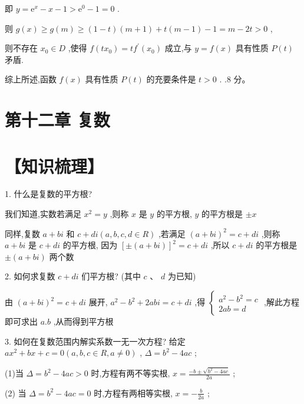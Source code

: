 \documentclass[10pt]{article}
\begin{document}
即 \(y = {\mathrm{e}}^{x} - x - 1 > {\mathrm{e}}^{0} - 1 = 0\) .

则 \(g\left( x\right)  \geq  g\left( m\right)  \geq  \left( {1 - t}\right) \left( {m + 1}\right)  + t\left( {m - 1}\right)  - 1 = m - {2t} > 0\) ,

则不存在 \({x}_{0} \in  D\) ,使得 \(f\left( {t{x}_{0}}\right)  = t{f}^{\prime }\left( {x}_{0}\right)\) 成立,与 \(y = f\left( x\right)\) 具有性质 \(P\left( t\right)\) 矛盾.

综上所述,函数 \(f\left( x\right)\) 具有性质 \(P\left( t\right)\) 的充要条件是 \(t > 0\) . .8 分。

\section*{第十二章 复数}

\section*{【知识梳理】}

1. 什么是复数的平方根?

我们知道,实数若满足 \({x}^{2} = y\) ,则称 \(x\) 是 \(y\) 的平方根, \(y\) 的平方根是 \(\pm  x\)

同样,复数 \(a + {bi}\) 和 \(c + {di}\left( {a,b,c,d \in  R}\right)\) ,若满足 \({\left( a + bi\right) }^{2} = c + {di}\) ,则称 \(a + {bi}\) 是 \(c + {di}\) 的平方根, 因为 \({\left\lbrack  \pm \left( a + bi\right) \right\rbrack  }^{2} = c + {di}\) ,所以 \(c + {di}\) 的平方根是 \(\pm  \left( {a + {bi}}\right)\) 两个数

2. 如何求复数 \(c + {di}\) 们平方根? (其中 \(c\text{ 、 }d\) 为已知)

由 \({\left( a + bi\right) }^{2} = c + {di}\) 展开, \({a}^{2} - {b}^{2} + {2abi} = c + {di}\) ,得 \(\left\{  \begin{matrix} {a}^{2} - {b}^{2} = c \\  {2ab} = d \end{matrix}\right.\) ,解此方程即可求出 \(a.b\) ,从而得到平方根

3. 如何在复数范围内解实系数一无一次方程? 给定 \(a{x}^{2} + {bx} + c = 0\left( {a,b,c \in  R,a \neq  0}\right)\) , \(\Delta  = {b}^{2} - {4ac}\) ;

(1)当 \(\Delta  = {b}^{2} - {4ac} > 0\) 时,方程有两不等实根, \(x = \frac{-b \pm  \sqrt{{b}^{2} - {4ac}}}{2a}\) ;

(2) 当 \(\Delta  = {b}^{2} - {4ac} = 0\) 时,方程有两相等实根, \(x =  - \frac{b}{2a}\) ;
\end{document}
